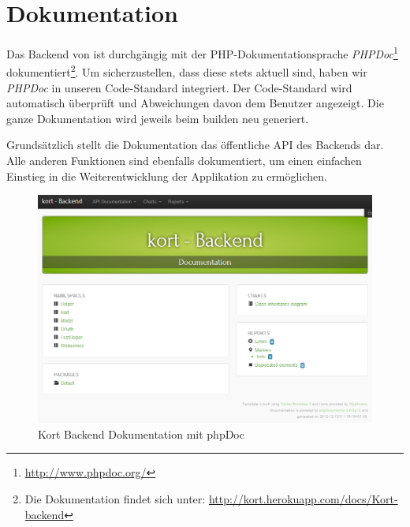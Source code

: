 \section{Dokumentation}
\label{backend-dokumentation}

Das Backend von \kort ist durchgängig mit der PHP-Dokumentationsprache \emph{PHPDoc}\footnote{\url{http://www.phpdoc.org/}} dokumentiert\footnote{Die Dokumentation findet sich unter: \url{http://kort.herokuapp.com/docs/Kort-backend}}.
Um sicherzustellen, dass diese stets aktuell sind, haben wir \emph{PHPDoc} in unseren Code-Standard integriert.
Der Code-Standard wird automatisch überprüft und Abweichungen davon dem Benutzer angezeigt.
Die ganze Dokumentation wird jeweils beim builden neu generiert.

Grundsätzlich stellt die Dokumentation das öffentliche \gls{API} des Backends dar.
Alle anderen Funktionen sind ebenfalls dokumentiert, um einen einfachen Einstieg in die Weiterentwicklung der Applikation zu ermöglichen.

\begin{figure}[H]
	\centering
	\includegraphics[width=\textwidth]{images/implementation/backend/kort-backend-documentation}
	\caption{Kort Backend Dokumentation mit phpDoc}
	\label{image-kort-backend-documentation}
\end{figure}